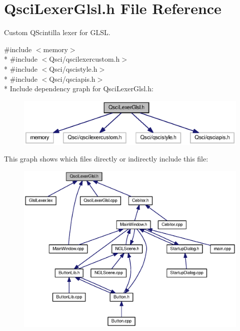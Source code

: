 \section{Qsci\-Lexer\-Glsl.\-h File Reference}
\label{_qsci_lexer_glsl_8h}


Custom Q\-Scintilla lexer for G\-L\-S\-L.  


{\ttfamily \#include $<$memory$>$}\\*
{\ttfamily \#include $<$Qsci/qscilexercustom.\-h$>$}\\*
{\ttfamily \#include $<$Qsci/qscistyle.\-h$>$}\\*
{\ttfamily \#include $<$Qsci/qsciapis.\-h$>$}\\*
Include dependency graph for Qsci\-Lexer\-Glsl.\-h\-:\nopagebreak
\begin{figure}[H]
\begin{center}
\leavevmode
\includegraphics[width=350pt]{_qsci_lexer_glsl_8h__incl}
\end{center}
\end{figure}
This graph shows which files directly or indirectly include this file\-:\nopagebreak
\begin{figure}[H]
\begin{center}
\leavevmode
\includegraphics[width=350pt]{_qsci_lexer_glsl_8h__dep__incl}
\end{center}
\end{figure}
